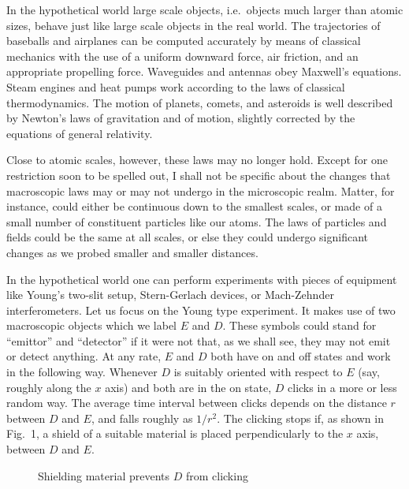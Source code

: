 \documentclass[12pt]{article}
\begin{document}
In the hypothetical world large scale objects,
i.e.\ objects much larger than atomic sizes, behave
just like large scale objects in the
real world.  The trajectories of baseballs and
airplanes can be computed accurately by means
of classical mechanics with the use of a
uniform downward force, air friction, and an
appropriate propelling force.  Waveguides and
antennas obey Maxwell's equations.  Steam engines and
heat pumps work according to the laws of
classical thermodynamics.  The motion of planets,
comets, and asteroids is well described by
Newton's laws of gravitation and of motion,
slightly corrected by the equations of
general relativity.

Close to atomic scales, however, these laws
may no longer hold.  Except for one restriction
soon to be spelled out, I shall not be specific
about the changes that macroscopic laws may or
may not undergo in the microscopic realm.  Matter, for
instance, could either be continuous down to
the smallest scales, or made of a small
number of constituent particles like our
atoms.  The laws of particles and fields
could be the same at all scales, or else
they could undergo significant changes
as we probed smaller and smaller distances.

\begin{sloppypar}
In the hypothetical world one can perform
experiments with pieces of equipment like 
Young's two-slit setup, Stern-Gerlach devices, or
Mach-Zehnder interferometers.  Let us focus on the
Young type experiment.  It makes use of two macroscopic
objects which we label $E$ and $D$.  These symbols could
stand for ``emittor'' and ``detector'' if it were not
that, as we shall see, they may not emit or detect
anything.  At any rate, $E$ and $D$
both have on and off states and work in the
following way.  Whenever $D$ is suitably
oriented with respect to $E$ (say, roughly
along the $x$ axis) and both are in
the on state, $D$ clicks in a more or less
random way.  The average time interval
between clicks depends on the distance $r$
between $D$ and $E$, and falls roughly as $1/r^2$.
The clicking stops if, as shown in Fig.~1, a shield of a
suitable material is placed perpendicularly
to the $x$ axis, between $D$ and $E$.
\end{sloppypar}


\begin{figure}[bt]
\begin{center}
\end{center}
\caption{Shielding material prevents $D$ from clicking}
\label{fig1}
\end{figure}
\end{document}
